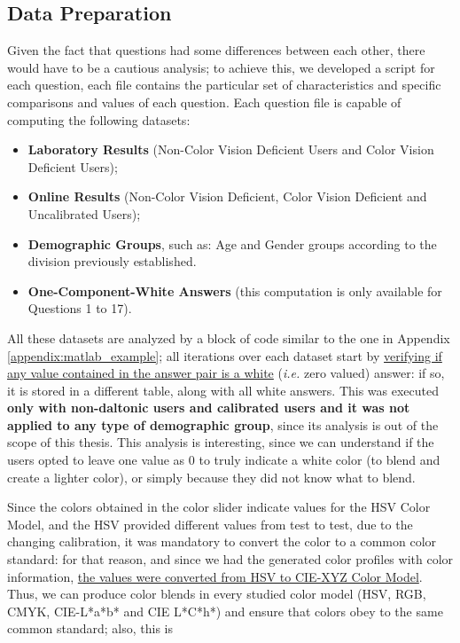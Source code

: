 \subsection{Data Preparation}
\label{subsec:results_preparation}
%
Given the fact that questions had some differences between each other, there would have to be a cautious analysis; to achieve this, we developed a script for each question, each
file contains the particular set of characteristics and specific comparisons and values of each question. Each question file is capable of computing the following datasets:
%
\begin{itemize}[noitemsep]
  \setlength\itemsep{0.01em}
  \item \textbf{Laboratory Results} (Non-Color Vision Deficient Users and Color Vision Deficient Users);
  \item \textbf{Online Results} (Non-Color Vision Deficient, Color Vision Deficient and Uncalibrated Users);
  \item \textbf{Demographic Groups}, such as: Age and Gender groups according to the division previously established.
  \item \textbf{One-Component-White Answers} (this computation is only available for Questions 1 to 17).
\end{itemize} \par
%
All these datasets are analyzed by a block of code similar to the one in Appendix \ref{appendix:matlab_example}; all iterations over each dataset start by \ul{verifying if any value contained in
the answer pair is a white} (\emph{i.e.} zero valued) answer: if so, it is stored in a different table, along with all white answers. This was executed \textbf{only
with non-daltonic users and calibrated users and it was not applied to any type of demographic group}, since its analysis is out of the scope of this thesis. This analysis is
interesting, since we can understand if the users opted to leave one value as 0 to truly indicate a white color (to blend and create a lighter color), or simply because they
did not know what to blend. \par
%
Since the colors obtained in the color slider indicate values for the HSV Color Model, and the HSV provided different values from test to test, due to the changing calibration, it was mandatory to
convert the color to a common color standard: for that reason, and since we had the generated color profiles with color information, \ul{the values were converted from HSV to CIE-XYZ Color Model}.
Thus, we can produce color blends in every studied color model (HSV, RGB, CMYK, CIE-L*a*b* and CIE L*C*h*) and ensure that colors obey to the same common standard; also, this is
